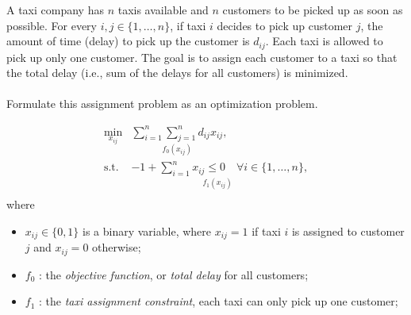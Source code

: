 \begin{homeworkProblem}
    
    A taxi company has $n$ taxis available and $n$ customers to be picked up as 
    soon as possible. For every $i, j \in \{1, \ldots, n\}$, if taxi $i$ decides 
    to pick up customer $j$, the amount of time (delay) to pick up the customer 
    is $d_{ij}$. Each taxi is allowed to pick up only one customer. The goal is 
    to assign each customer to a taxi so that the total delay (i.e., sum of the 
    delays for all customers) is minimized.
    \\ \\
    Formulate this assignment problem as an optimization problem.
    \\

    \begin{solution}
        \[
            \begin{array}{rl}
            \min\limits_{x_{ij}} & \underset{f_0(x_{ij})}{\boxed{\sum_{i=1}^{n} \sum_{j=1}^{n} d_{ij} x_{ij}}}, \\ [3ex]
            \text{s.t.} & \underset{f_1(x_{ij})}{\boxed{-1 + \sum_{i=1}^{n} x_{ij} \leq 0 \quad \forall i \in \{1, \dots, n\}}}, \\ [3ex]
            \end{array}
        \]
        where
        \begin{itemize}
            \item \(x_{ij} \in \{0, 1\}\) is a binary variable, where \(x_{ij} = 1\) if taxi \(i\) is assigned to customer \(j\) and \(x_{ij} = 0\) otherwise;
            \item $f_0$ : the \textit{objective function}, or \textit{total delay} for all customers;
            \item $f_1$ : the \textit{taxi assignment constraint}, each taxi can only pick up one customer;
        \end{itemize}

    \end{solution}
\end{homeworkProblem}